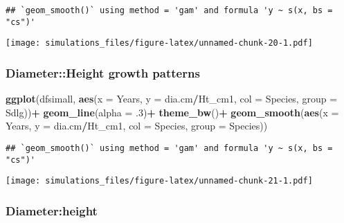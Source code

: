 \documentclass[]{article}
\newenvironment{Shaded}{\begin{snugshade}}{\end{snugshade}}
\newcommand{\KeywordTok}[1]{\textcolor[rgb]{0.13,0.29,0.53}{\textbf{#1}}}
\newcommand{\DataTypeTok}[1]{\textcolor[rgb]{0.13,0.29,0.53}{#1}}
\newcommand{\DecValTok}[1]{\textcolor[rgb]{0.00,0.00,0.81}{#1}}
\newcommand{\StringTok}[1]{\textcolor[rgb]{0.31,0.60,0.02}{#1}}
\newcommand{\OperatorTok}[1]{\textcolor[rgb]{0.81,0.36,0.00}{\textbf{#1}}}
\newcommand{\NormalTok}[1]{#1}
\begin{document}
\begin{verbatim}
## `geom_smooth()` using method = 'gam' and formula 'y ~ s(x, bs = "cs")'
\end{verbatim}

\texttt{[image: simulations\_files/figure-latex/unnamed-chunk-20-1.pdf]}

\subsubsection{Diameter::Height growth
patterns}\label{diameterheight-growth-patterns}

\begin{Shaded}
\begin{Highlighting}[]
\KeywordTok{ggplot}\NormalTok{(dfsimall, }\KeywordTok{aes}\NormalTok{(}\DataTypeTok{x =}\NormalTok{ Years, }\DataTypeTok{y =}\NormalTok{ dia.cm}\OperatorTok{/}\NormalTok{Ht_cm1, }\DataTypeTok{col =}\NormalTok{ Species, }\DataTypeTok{group =}\NormalTok{ Sdlg))}\OperatorTok{+}
\StringTok{  }\KeywordTok{geom_line}\NormalTok{(}\DataTypeTok{alpha =}\NormalTok{ .}\DecValTok{3}\NormalTok{)}\OperatorTok{+}
\StringTok{  }\KeywordTok{theme_bw}\NormalTok{()}\OperatorTok{+}
\StringTok{  }\KeywordTok{geom_smooth}\NormalTok{(}\KeywordTok{aes}\NormalTok{(}\DataTypeTok{x =}\NormalTok{ Years, }\DataTypeTok{y =}\NormalTok{ dia.cm}\OperatorTok{/}\NormalTok{Ht_cm1, }\DataTypeTok{col =}\NormalTok{ Species, }\DataTypeTok{group =}\NormalTok{ Species))}
\end{Highlighting}
\end{Shaded}

\begin{verbatim}
## `geom_smooth()` using method = 'gam' and formula 'y ~ s(x, bs = "cs")'
\end{verbatim}

\texttt{[image: simulations\_files/figure-latex/unnamed-chunk-21-1.pdf]}

\subsubsection{Diameter:height}\label{diameterheight}

\begin{Shaded}
\end{Shaded}
\end{document}
